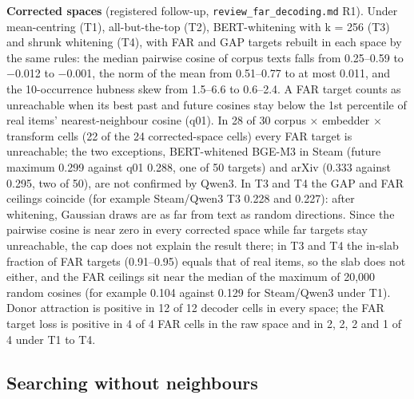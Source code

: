\documentclass[
  10pt,
]{article}
\begin{document}
\textbf{Corrected spaces} (registered
follow-up,
\texttt{review\_\allowbreak{}far\_\allowbreak{}decoding.md}
R1). Under mean-centring (T1),
all-but-the-top (T2), BERT-whitening
with k = 256 (T3) and shrunk whitening
(T4), with FAR and GAP targets rebuilt
in each space by the same rules: the
median pairwise cosine of corpus texts
falls from 0.25--0.59 to −0.012 to
−0.001, the norm of the mean from
0.51--0.77 to at most 0.011, and the
10-occurrence hubness skew from 1.5--6.6
to 0.6--2.4. A FAR target counts as
unreachable when its best past and
future cosines stay below the 1st
percentile of real items'
nearest-neighbour cosine (q01). In 28 of
30 corpus × embedder × transform cells
(22 of the 24 corrected-space cells)
every FAR target is unreachable; the two
exceptions, BERT-whitened BGE-M3 in
Steam (future maximum 0.299 against q01
0.288, one of 50 targets) and arXiv
(0.333 against 0.295, two of 50), are
not confirmed by Qwen3. In T3 and T4 the
GAP and FAR ceilings coincide (for
example Steam/Qwen3 T3 0.228 and 0.227):
after whitening, Gaussian draws are as
far from text as random directions.
Since the pairwise cosine is near zero
in every corrected space while far
targets stay unreachable, the cap does
not explain the result there; in T3 and
T4 the in-slab fraction of FAR targets
(0.91--0.95) equals that of real items,
so the slab does not either, and the FAR
ceilings sit near the median of the
maximum of 20,000 random cosines (for
example 0.104 against 0.129 for
Steam/Qwen3 under T1). Donor attraction
is positive in 12 of 12 decoder cells in
every space; the FAR target loss is
positive in 4 of 4 FAR cells in the raw
space and in 2, 2, 2 and 1 of 4 under T1
to T4.

\subsection{Searching without neighbours}\label{app:A.4}
\end{document}
